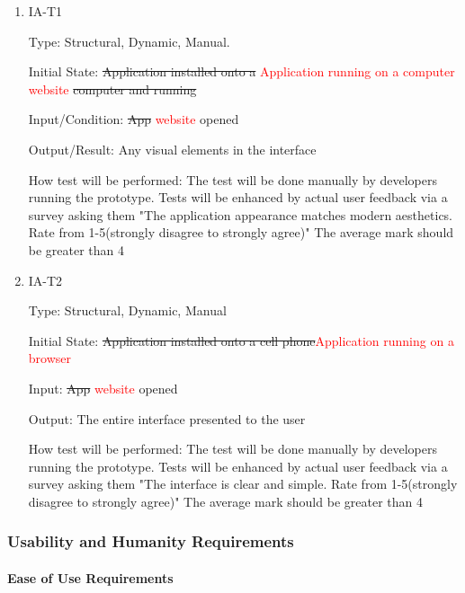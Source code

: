 \documentclass[12pt, titlepage]{article}
\begin{document}
\begin{enumerate}

\item{IA-T1\\}

Type: Structural, Dynamic, Manual.
					
Initial State: \sout{Application installed onto a }\textcolor{red}{Application running on a computer website} \sout{computer and running}
					
Input/Condition: \sout{App} \textcolor{red}{website} opened
					
Output/Result: Any visual elements in the interface
					
How test will be performed: The test will be done manually by developers running the prototype. Tests will be enhanced by actual user feedback via a survey asking them "The application appearance matches modern aesthetics. Rate from 1-5(strongly disagree to strongly agree)" The average mark should be greater than 4
					
\item{IA-T2\\}

Type: Structural, Dynamic, Manual
					
Initial State: \sout{Application installed onto a cell phone}\textcolor{red}{Application running on a browser}
					
Input: \sout{App} \textcolor{red}{website} opened
					
Output: The entire interface presented to the user
					
How test will be performed: The test will be done manually by developers running the prototype. Tests will be enhanced by actual user feedback via a survey asking them "The interface is clear and simple. Rate from 1-5(strongly disagree to strongly agree)" The average mark should be greater than 4

\end{enumerate}

\subsubsection{Usability and Humanity Requirements}
		
\paragraph{Ease of Use Requirements}
\end{document}
